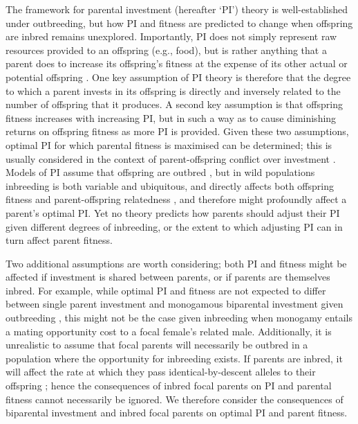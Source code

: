 \documentclass[12pt]{article}
\begin{document}
The framework for parental investment (hereafter `PI') theory is well-established under outbreeding, but how PI and fitness are predicted to change when offspring are inbred remains unexplored. Importantly, PI does not simply represent raw resources provided to an offspring (e.g., food), but is rather anything that a parent does to increase its offspring's fitness at the expense of its other actual or potential offspring \cite[][]{Trivers1972, Trivers1974}. One key assumption of PI theory is therefore that the degree to which a parent invests in its offspring is directly and inversely related to the number of offspring that it produces. A second key assumption is that offspring fitness increases with increasing PI, but in such a way as to cause diminishing returns on offspring fitness as more PI is provided. Given these two assumptions, optimal PI for which parental fitness is maximised can be determined; this is usually considered in the context of parent-offspring conflict over investment \cite[e.g.,][]{Macnair1978, Parker1978, Parker1985, DeJong2005, Kuijper2012}. Models of PI assume that offspring are outbred \cite[or the result of self-fertilisation as in][]{DeJong2005}, but in wild populations inbreeding is both variable and ubiquitous, and directly affects both offspring fitness and parent-offspring relatedness \cite[][]{OGrady2006, Charlesworth2009}, and therefore might profoundly affect a parent's optimal PI. Yet no theory predicts how parents should adjust their PI given different degrees of inbreeding, or the extent to which adjusting PI can in turn affect parent fitness.

Two additional assumptions are worth considering; both PI and fitness might be affected if investment is shared between parents, or if parents are themselves inbred. For example, while optimal PI and fitness are not expected to differ between single parent investment and monogamous biparental investment given outbreeding \cite[][]{Parker1985}, this might not be the case given inbreeding when monogamy entails a mating opportunity cost \cite[][]{Waser1986} to a focal female's related male. Additionally, it is unrealistic to assume that focal parents will necessarily be outbred in a population where the opportunity for inbreeding exists. If parents are inbred, it will affect the rate at which they pass identical-by-descent alleles to their offspring \cite[e.g.,][]{Duthie2015a}; hence the consequences of inbred focal parents on PI and parental fitness cannot necessarily be ignored. We therefore consider the consequences of biparental investment and inbred focal parents on optimal PI and parent fitness.
\end{document}
